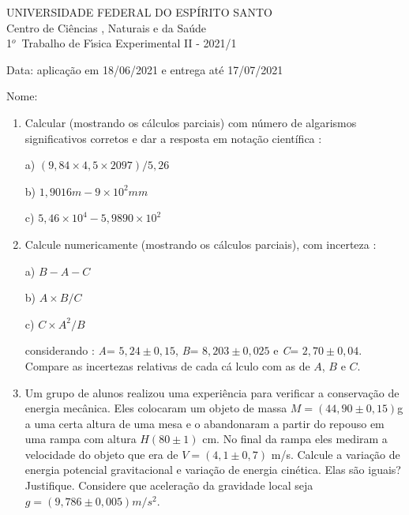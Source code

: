 \documentclass[a4paper,11pt]{report}
\begin{document}
\begin{center}
{\large UNIVERSIDADE FEDERAL DO ESP\'{I}RITO SANTO} \\[0pt]
{\large Centro de Ci\^{e}ncias , Naturais e da Sa\'{u}de} \\[0pt]
\vspace*{0.5cm} {\large 1}$^{o}${\large \ Trabalho de F\'{\i}sica Experimental II - 2021/1}

Data: aplica\c{c}\~{a}o em 18/06/2021 e entrega at\'{e} 17/07/2021
\end{center}

Nome: 

\begin{enumerate}
\item Calcular (mostrando os c\'{a}lculos parciais) com 
n\'{u}mero de algarismos significativos corretos e dar a resposta em 
nota\c{c}\~{a}o cient\'{i}fica :

a) $(9,84\times 4,5\times 2097)/5,26$\hspace{7.5cm}

b) $1,9016m-9\times 10^{2}mm$

c) $5,46\times 10^{4}-5,9890\times 10^{2}$

\item Calcule numericamente (mostrando os c\'{a}lculos 
parciais), com incerteza :

a) $B-A-C$

b) $A\times B / C$

c) $C\times A^{2}/B$

considerando : \textit{A}= $5,24\pm 0,15$, \textit{B}= $8,203\pm 0,025$ e 
\textit{C}= $2,70\pm 0,04$. Compare as incertezas relativas de cada c\'{a}%
lculo com as de $A$, $B$ e $C$.

\item Um grupo de alunos realizou uma experi\^{e}ncia para verificar a conserva\c{c}\~{a}o de energia mec\^{a}nica. Eles colocaram um objeto de massa $M = (44,90 \pm 0,15)$g a uma certa altura de uma mesa e o abandonaram a partir do repouso em  uma rampa com altura $H (80 \pm 1)$ cm. No final da rampa eles mediram a velocidade do objeto que era de $V = (4,1 \pm 0,7)$ m/s. Calcule a varia\c{c}\~{a}o de energia potencial gravitacional e varia\c{c}\~{a}o de energia cin\'{e}tica. Elas s\~{a}o iguais? Justifique. Considere que acelera\c{c}\~{a}o da gravidade local seja $g = (9,786 \pm 0,005) m/s^{2}$.


\end{enumerate}
\end{document}
